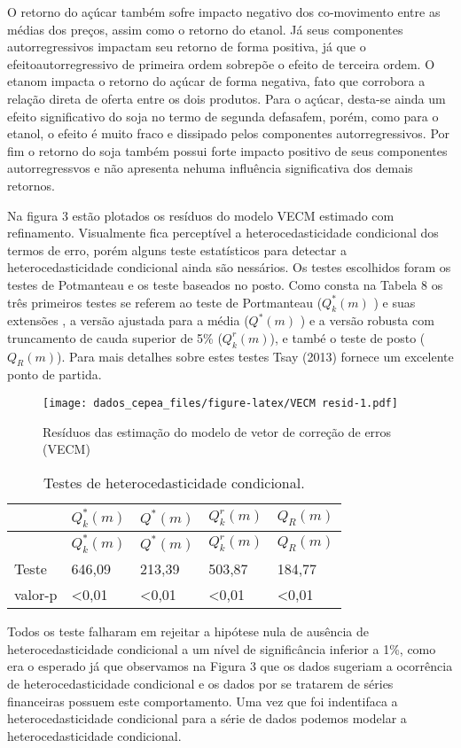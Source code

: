 \documentclass[]{article}
\begin{document}
O retorno do açúcar também sofre impacto negativo dos co-movimento entre
as médias dos preços, assim como o retorno do etanol. Já seus
componentes autorregressivos impactam seu retorno de forma positiva, já
que o efeitoautorregressivo de primeira ordem sobrepõe o efeito de
terceira ordem. O etanom impacta o retorno do açúcar de forma negativa,
fato que corrobora a relação direta de oferta entre os dois produtos.
Para o açúcar, desta-se ainda um efeito significativo do soja no termo
de segunda defasafem, porém, como para o etanol, o efeito é muito fraco
e dissipado pelos componentes autorregressivos. Por fim o retorno do
soja também possui forte impacto positivo de seus componentes
autorregressvos e não apresenta nehuma influência significativa dos
demais retornos.

Na figura 3 estão plotados os resíduos do modelo VECM estimado com
refinamento. Visualmente fica perceptível a heterocedasticidade
condicional dos termos de erro, porém alguns teste estatísticos para
detectar a heterocedasticidade condicional ainda são nessários. Os
testes escolhidos foram os testes de Potmanteau e os teste baseados no
posto. Como consta na Tabela 8 os três primeiros testes se referem ao
teste de Portmanteau (\(Q^*_k(m)\) ) e suas extensões , a versão
ajustada para a média (\(Q^*(m)\) ) e a versão robusta com truncamento
de cauda superior de 5\% (\(Q^r_k(m)\)), e també o teste de posto
(\(Q_R(m)\)). Para mais detalhes sobre estes testes Tsay (2013) fornece
um excelente ponto de partida.

\begin{figure}[htbp]
\centering
\texttt{[image: dados\_cepea\_files/figure-latex/VECM resid-1.pdf]}
\caption{Resíduos das estimação do modelo de vetor de correção de erros
(VECM)}
\end{figure}

\begin{longtable}[]{@{}lllll@{}}
\caption{Testes de heterocedasticidade condicional.}\tabularnewline
\toprule
& \(Q^*_k(m)\) & \(Q^*(m)\) & \(Q^r_k(m)\) & \(Q_R(m)\)\tabularnewline
\midrule
\endfirsthead
\toprule
& \(Q^*_k(m)\) & \(Q^*(m)\) & \(Q^r_k(m)\) & \(Q_R(m)\)\tabularnewline
\midrule
\endhead
Teste & 646,09 & 213,39 & 503,87 & 184,77\tabularnewline
valor-p & \textless{}0,01 & \textless{}0,01 & \textless{}0,01 &
\textless{}0,01\tabularnewline
\bottomrule
\end{longtable}

Todos os teste falharam em rejeitar a hipótese nula de ausência de
heterocedasticidade condicional a um nível de significância inferior a
1\%, como era o esperado já que observamos na Figura 3 que os dados
sugeriam a ocorrência de heterocedasticidade condicional e os dados por
se tratarem de séries financeiras possuem este comportamento. Uma vez
que foi indentifaca a heterocedasticidade condicional para a série de
dados podemos modelar a heterocedasticidade condicional.
\end{document}
